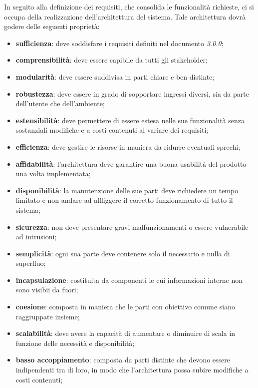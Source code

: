     	In seguito alla definizione dei requisiti, che consolida le funzionalità richieste, ci si occupa della realizzazione dell'architettura del sistema. Tale architettura dovrà godere delle seguenti proprietà:
    	\begin{itemize}
    		\item{\textbf{sufficienza}}: deve soddisfare i requisiti definiti nel documento \AdR{} \textit{3.0.0};
    		\item{\textbf{comprensibilità}}: deve essere capibile da tutti gli stakeholder;
    		\item{\textbf{modularità}}: deve essere suddivisa in parti chiare e ben distinte;
    		\item{\textbf{robustezza}}: deve essere in grado di sopportare ingressi diversi, sia da parte dell'utente che dell'ambiente;
    		\item{\textbf{estensibilità}}: deve permettere di essere estesa nelle sue funzionalità senza sostanziali modifiche e a costi contenuti al variare dei requisiti;
    		\item{\textbf{efficienza}}: deve gestire le risorse in maniera da ridurre eventuali sprechi;
    		\item{\textbf{affidabilità}}: l'architettura deve garantire una buona usabilità del prodotto una volta implementata;
    		\item{\textbf{disponibilità}}: la manutenzione delle sue parti deve richiedere un tempo limitato e non andare ad affliggere il corretto funzionamento di tutto il sistema;
    		\item{\textbf{sicurezza}}: non deve presentare gravi malfunzionamenti o essere vulnerabile ad intrusioni;
    		\item{\textbf{semplicità}}: ogni sua parte deve contenere solo il necessario e nulla di superfluo;
    		\item{\textbf{incapsulazione}}: costituita da componenti le cui informazioni interne non sono visibii da fuori;
    		\item{\textbf{coesione}}: composta in maniera che le parti con obiettivo comune siano raggruppate insieme;
    		\item{\textbf{scalabilità}}: deve avere la capacità di aumentare o diminuire di scala in funzione delle necessità e disponibilità;
    		\item{\textbf{basso accoppiamento}}: composta da parti distinte che devono essere indipendenti tra di loro, in modo che l'architettura possa subire modifiche a costi contenuti;
    	\end{itemize}

